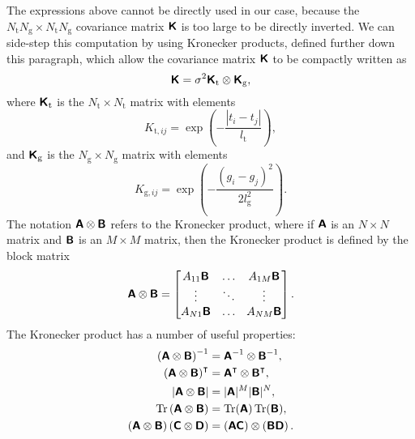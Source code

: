 \documentclass[fleqn,usenatbib]{mnras}
\begin{document}
The expressions above cannot be directly used in our case, because the $N_\text{t}N_\text{g} \times N_\text{t}N_\text{g}$ covariance matrix $\textbf{\textsf{K}}$ is too large to be directly inverted. We can side-step this computation by using Kronecker products, defined further down this paragraph, which allow the covariance matrix $\textbf{\textsf{K}}$ to be compactly written as
\begin{equation}
    \textbf{\textsf{K}} = \sigma^2\textbf{\textsf{K}}_\text{t}\otimes\textbf{\textsf{K}}_\text{g},
\end{equation}
where $\textbf{\textsf{K}}_\text{t}$ is the $N_\text{t} \times N_\text{t}$ matrix with elements
\begin{equation}
    K_{\text{t},ij} = \exp\left(-\frac{|t_i-t_j|}{l_{\mathrm{t}}}\right),
\end{equation} and $\textbf{\textsf{K}}_\text{g}$ is the $N_\text{g} \times N_\text{g}$ matrix with elements
\begin{equation}
    K_{\text{g},ij} = \exp\left(-\frac{(g_i-g_j)^2}{2l_{\mathrm{g}}^2}\right) .
\end{equation} The notation $\textbf{\textsf{A}}\otimes\textbf{\textsf{B}}$ refers to the Kronecker product, where if $\textbf{\textsf{A}}$ is an $N \times N$ matrix and $\textbf{\textsf{B}}$ is an $M \times M$ matrix, then the Kronecker product is defined by the block matrix
\begin{equation}
    \textbf{\textsf{A}}\otimes\textbf{\textsf{B}} = \begin{bmatrix}
    A_{11}\textbf{\textsf{B}} & \hdots & A_{1M}\textbf{\textsf{B}} \\
    \vdots             & \ddots & \vdots             \\
    A_{N1}\textbf{\textsf{B}} & \hdots & A_{NM}\textbf{\textsf{B}}
    \end{bmatrix}.
\end{equation}
The Kronecker product has a number of useful properties:
\begin{align}
    \left(\textbf{\textsf{A}} \otimes \textbf{\textsf{B}}\right)^{-1} &= \textbf{\textsf{A}}^{-1} \otimes \textbf{\textsf{B}}^{-1}, \\
    \left(\textbf{\textsf{A}} \otimes \textbf{\textsf{B}}\right)^{\intercal} &= \textbf{\textsf{A}}^{\intercal} \otimes \textbf{\textsf{B}}^{\intercal}, \\
    \left|\textbf{\textsf{A}} \otimes \textbf{\textsf{B}}\right| &= |\textbf{\textsf{A}}|^M|\textbf{\textsf{B}}|^N, \\
    \operatorname{Tr}\left(\textbf{\textsf{A}} \otimes \textbf{\textsf{B}}\right) &= \operatorname{Tr}(\textbf{\textsf{A}})\operatorname{Tr}(\textbf{\textsf{B}}), \\
    \left(\textbf{\textsf{A}}\otimes\textbf{\textsf{B}}\right) \left(\textbf{\textsf{C}}\otimes\textbf{\textsf{D}}\right)&= \left(\textbf{\textsf{AC}}\right)\otimes\left(\textbf{\textsf{BD}}\right).
\end{align}
\end{document}
